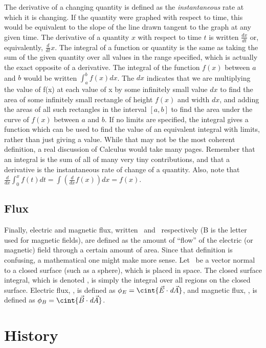 \documentclass[12pt]{article}
\begin{document}
\indent The derivative of a changing quantity is defined as the \textit{instantaneous} rate at which it is changing. If the quantity were graphed with respect to time, this would be equivalent to the slope of the line drawn tangent to the graph at any given time. The derivative of a quantity $x$ with respect to time $t$ is written $\displaystyle \frac{dx}{dt}$ or, equivalently, $\displaystyle \frac{d}{dt} x$. The integral of a function or quantity is the same as taking the sum of the given quantity over all values in the range specified, which is actually the exact opposite of a derivative. The integral of the function $f(x)$ between $a$ and $b$ would be written $\displaystyle\int_a^b{f(x)dx}$. The $dx$ indicates that we are multiplying the value of f(x) at each value of x by some infinitely small value $dx$ to find the area of some infinitely small rectangle of height $f(x)$ and width $dx$, and adding the areas of all such rectangles in the interval $[a,b]$ to find the area under the curve of $f(x)$ between $a$ and $b$. If no limits are specified, the integral gives a function which can be used to find the value of an equivalent integral with limits, rather than just giving a value. While that may not be the most coherent definition, a real discussion of Calculus would take many pages. Remember that an integral is the sum of all of many very tiny contributions, and that a derivative is the instantaneous rate of change of a quantity. Also, note that $\displaystyle \frac{d}{dx} \int_0^x{f(t)dt}=\int{\left(\frac{d}{dx}f(x)\right)dx}=f(x)$.

\subsection{Flux}

\indent Finally, electric and magnetic flux, written \phie \ and \phib \ respectively (B is the letter used for magnetic fields), are defined as the amount of ``flow'' of the electric (or magnetic) field through a certain amount of area. Since that definition is confusing, a mathematical one might make more sense. Let \dA \ be a vector normal to a closed surface (such as a sphere), which is placed in space. The closed surface integral, which is denoted \cint{}, is simply the integral over all regions on the closed surface. Electric flux, \phie, is defined as $\phie=\cint{\vec{E}\cdot \dA}$, and magnetic flux, \phib, is defined as $\phib=\cint{\vec{B}\cdot \dA}$.

\section{History}
\end{document}
